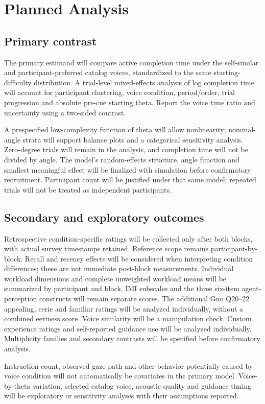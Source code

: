 \documentclass[11pt,letterpaper]{article}
\begin{document}
\setcounter{section}{4}
\section{Planned Analysis}
\subsection{Primary contrast}
The primary estimand will compare active completion time under the self-similar and participant-preferred catalog voices, standardized to the same starting-difficulty distribution. A trial-level mixed-effects analysis of log completion time will account for participant clustering, voice condition, period/order, trial progression and absolute pre-cue starting theta. Report the voice time ratio and uncertainty using a two-sided contrast.

A prespecified low-complexity function of theta will allow nonlinearity; nominal-angle strata will support balance plots and a categorical sensitivity analysis. Zero-degree trials will remain in the analysis, and completion time will not be divided by angle. The model's random-effects structure, angle function and smallest meaningful effect will be finalized with simulation before confirmatory recruitment. Participant count will be justified under that same model; repeated trials will not be treated as independent participants.

\subsection{Secondary and exploratory outcomes}
Retrospective condition-specific ratings will be collected only after both blocks, with actual survey timestamps retained. Reference scope remains participant-by-block. Recall and recency effects will be considered when interpreting condition differences; these are not immediate post-block measurements. Individual workload dimensions and complete unweighted workload means will be summarized by participant and block. IMI subscales and the three six-item agent-perception constructs will remain separate scores. The additional Guo Q20--22 appealing, eerie and familiar ratings will be analyzed individually, without a combined eeriness score. Voice similarity will be a manipulation check. Custom experience ratings and self-reported guidance use will be analyzed individually. Multiplicity families and secondary contrasts will be specified before confirmatory analysis.

Instruction count, observed gaze path and other behavior potentially caused by voice condition will not automatically be covariates in the primary model. Voice-by-theta variation, selected catalog voice, acoustic quality and guidance timing will be exploratory or sensitivity analyses with their assumptions reported.
\end{document}
